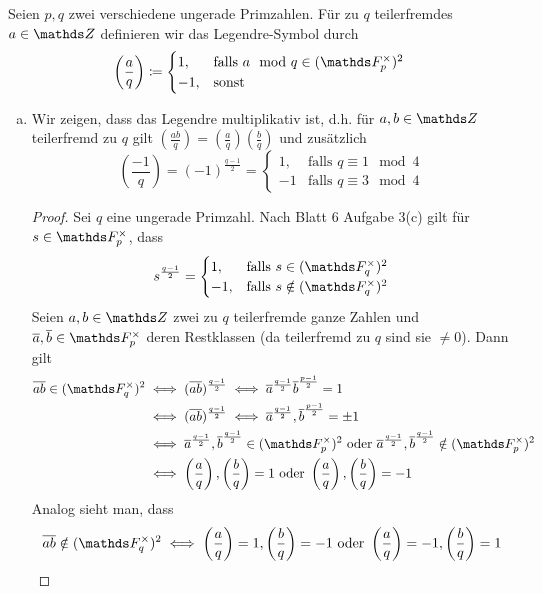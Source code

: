 Seien $p,q$ zwei verschiedene ungerade Primzahlen. Für zu $q$ teilerfremdes $a\in \Z$
definieren wir das Legendre-Symbol durch
\[
\left(\frac{a}{q}\right) \coloneqq \begin{cases} 1, & \text{falls\ } a \mod q\in (\F_p^\times)^2 \\ -1, & \text{sonst}
\end{cases}   
\]
\begin{enumerate}[(a)]
    \item Wir zeigen, dass das Legendre multiplikativ ist, d.h. für $a,b\in \Z$ teilerfremd zu $q$ gilt 
    $
    \left(\frac{ab}{q}\right) = \left(\frac{a}{q}\right)\left(\frac{b}{q}\right)    
    $
    und zusätzlich 
    \[
    \left(\frac{-1}{q}\right) = (-1)^{\frac{q-1}{2}} = \begin{cases}
        1, & \text{falls\ }q\equiv 1 \mod 4 \\
        -1 & \text{falls\ } q\equiv 3 \mod 4
    \end{cases}    
    \]
    \begin{proof}
        Sei $q$ eine ungerade Primzahl. Nach Blatt 6 Aufgabe 3(c) gilt für $s\in \F_p^\times$, dass 
        \[
        s^{\frac{q-1}{2}} = \begin{cases}
            1, & \text{falls } s\in (\F_q^\times)^2 \\
            -1, & \text{falls } s\notin (\F_q^\times)^2 
        \end{cases}    
        \] 
        Seien $a,b\in \Z$ zwei zu $q$ teilerfremde ganze Zahlen und $\overline{a},\overline{b}\in \F_p^\times$ deren Restklassen (da teilerfremd zu $q$ sind sie $\neq 0$).
        Dann gilt 
        \begin{align*}
            \overline{ab}\in (\F_q^\times)^2 &\iff (\overline{ab})^{\frac{q-1}{2}} \iff \overline{a}^{\frac{q-1}{2}}\overline{b}^{\frac{p-1}{2}}=1 \\ &\iff (\overline{ab})^{\frac{q-1}{2}} \iff \overline{a}^{\frac{q-1}{2}},\overline{b}^{\frac{p-1}{2}} = \pm 1 \\ 
            &\iff \overline{a}^{\frac{q-1}{2}},\overline{b}^{\frac{q-1}{2}}\in (\F_p^\times)^2 \ \text{oder} \ \overline{a}^{\frac{q-1}{2}},\overline{b}^{\frac{q-1}{2}}\notin (\F_p^\times)^2 \\
            &\iff \left(\frac{a}{q}\right),\left(\frac{b}{q}\right)=1 \text{ oder } \left(\frac{a}{q}\right),\left(\frac{b}{q}\right) = -1
        \end{align*} 
        Analog sieht man, dass 
        \[
            \overline{ab}\notin (\F_q^\times)^2 \iff \left(\frac{a}{q}\right)=1,\left(\frac{b}{q}\right)=-1 \text{ oder } \left(\frac{a}{q}\right)=-1,\left(\frac{b}{q}\right) = 1
\]
\end{proof}
\end{enumerate}
